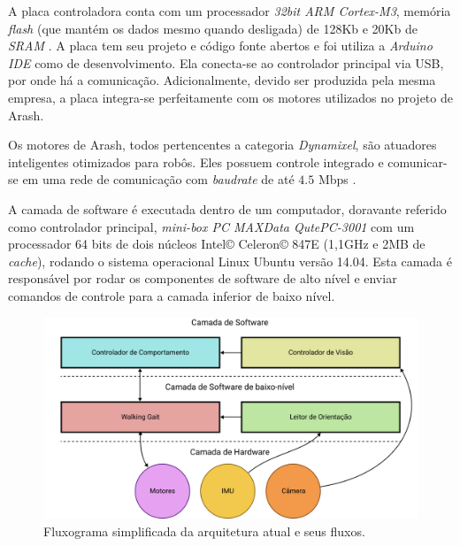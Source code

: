 A placa controladora conta com um processador \textit{32bit ARM Cortex-M3}, memória \textit{flash} (que mantém os dados mesmo quando desligada) de 128Kb e 20Kb de \textit{SRAM} \cite{opencm904}. A placa tem seu projeto e código fonte abertos e foi utiliza a \textit{Arduino IDE} como  de desenvolvimento. Ela conecta-se ao controlador principal via USB, por onde há a comunicação. Adicionalmente, devido ser produzida pela mesma empresa, a placa integra-se perfeitamente com os motores utilizados no projeto de Arash.

Os motores de Arash, todos pertencentes a categoria \textit{Dynamixel}, são atuadores inteligentes otimizados para robôs. Eles possuem controle  integrado e comunicar-se em uma rede de comunicação  com \textit{baudrate} de até $4.5$ Mbps \cite{dynamixel}.

A camada de software é executada dentro de um computador, doravante referido como controlador principal, \textit{mini-box PC MAXData QutePC-3001} com um processador 64 bits de dois núcleos Intel\copyright{} Celeron\copyright{} 847E (1,1GHz e 2MB de \textit{cache}), rodando o sistema operacional Linux Ubuntu versão 14.04. Esta camada é responsável por rodar os componentes de software de alto nível e enviar comandos de controle para a camada inferior de baixo nível.

\begin{figure}[htb]
	\centering
	\includegraphics[scale=1]{imagens/svg/softwarearchitecture-flow}
	\caption{Fluxograma simplificada da arquitetura atual e seus fluxos.}
	\label{fig:softwarearchitecture:overview}
\end{figure}

